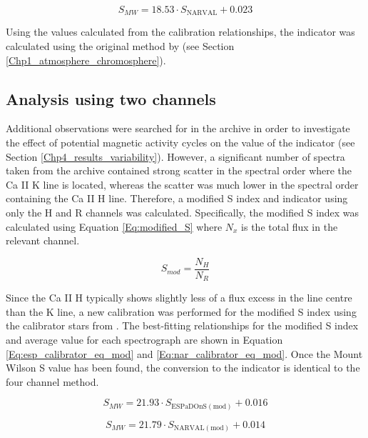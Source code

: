 \begin{equation}
S_{MW} = 18.53 \cdot S_{\mathrm{NARVAL}} + 0.023
\label{Eq:nar_calibrator_eq}
\end{equation} 

Using the \Smw values calculated from the calibration relationships, the \Rprime indicator was calculated using the original method by \citet{Noyes_etal_1984} (see Section \ref{Chp1_atmosphere_chromosphere}).

\subsection{Analysis using two channels}
\label{Chp4_data_analysis_two_channel}
Additional observations were searched for in the \esp archive in order to investigate the effect of potential magnetic activity cycles on the value of the \Rprime indicator (see Section \ref{Chp4_results_variability}). However, a significant number of spectra taken from the \esp archive contained strong scatter in the spectral order where the Ca II K line is located, whereas the scatter was much lower in the spectral order containing the Ca II H line. Therefore, a modified S index and \Rprime indicator using only the H and R channels was calculated. Specifically, the modified S index was calculated using Equation \ref{Eq:modified_S} where $N_{x}$ is the total flux in the relevant channel.

\begin{equation}
    S_{mod} = \frac{N_{H}}{N_{R}}
    \label{Eq:modified_S}
\end{equation}

Since the Ca II H typically shows slightly less of a flux excess in the line centre than the K line, a new \Smw calibration was performed for the modified S index using the calibrator stars from \citet{Duncan_etal_1991}. The best-fitting relationships for the modified S index and average \Smw value for each spectrograph are shown in Equation \ref{Eq:esp_calibrator_eq_mod} and \ref{Eq:nar_calibrator_eq_mod}. Once the Mount Wilson S value has been found, the conversion to the \Rprime indicator is identical to the four channel method.

\begin{equation}
S_{MW} = 21.93 \cdot S_{\mathrm{ESPaDOnS (mod)}}+ 0.016
\label{Eq:esp_calibrator_eq_mod}
\end{equation}

\begin{equation}
S_{MW} = 21.79 \cdot S_{\mathrm{NARVAL (mod)}} + 0.014
\label{Eq:nar_calibrator_eq_mod}
\end{equation} 

